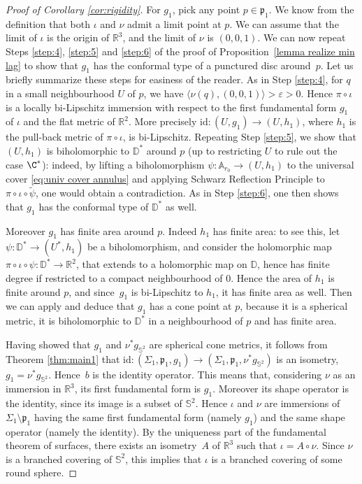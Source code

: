 \documentclass[JEP,XML,SOM,Unicode,NoEqCountersInSection,published]{cedram}
\let\epsilon\varepsilon
\newcounter{steps}
\theoremstyle{definition}
\newcommand{\R}{{\mathbb R}}
\begin{document}
\begin{proof}[Proof of Corollary \ref{cor:rigidity}]
For $g_1$, pick any point $p\in\mathfrak p_1$. We know from the definition that both $\iota$ and $\nu$ admit a limit point at $p$. We can assume that the limit of $\iota$ is the origin of $\R^3$, and the limit of $\nu$ is $(0,0,1)$. We can now repeat Steps \ref{step:4}, \ref{step:5} and \ref{step:6} of the proof of Proposition~\ref{lemma realize min lag} to show that $g_1$ has the conformal type of a punctured disc around~$p$.
Let us briefly summarize these steps for easiness of the reader.
As in Step \ref{step:4}, for $q$ in a small neighbourhood $U$ of $p$, we have $\langle\nu(q),(0,0,1)\rangle>\epsilon>0$. Hence $\pi\circ \iota$ is a locally bi-Lipschitz immersion with respect to the first fundamental form $g_1$ of $\iota$ and the flat metric of $\R^2$. More precisely $\mathrm{id}:(U,g_1)\to (U,h_1)$, where $h_1$ is the pull-back metric of $\pi\circ \iota$, is bi-Lipschitz. Repeating Step \ref{step:5}, we show that $(U,h_1)$ is biholomorphic to $\mathbb D^*$ around $p$ (up to restricting $U$ to rule out the case $\C^*$): indeed, by lifting a biholomorphism $\psi:{\mathbb A_{r_0}}\to(U,h_1)$ to the universal cover \eqref{eq:univ cover annulus} and applying Schwarz Reflection Principle to $\pi\circ\iota\circ\widetilde\psi$, one would obtain a contradiction. As in Step \ref{step:6}, one then shows that $g_1$ has the conformal type of $\mathbb D^*$ as well.

Moreover $g_1$ has finite area around $p$. Indeed $h_1$ has finite area: to see this, let $\psi:\mathbb D^*\to (U^*,h_1)$ be a biholomorphism, and consider the holomorphic map $\pi\circ \iota\circ\psi:\mathbb D^*\to\R^2$, that extends to a holomorphic map on $\mathbb D$, hence has finite degree if restricted to a compact neighbourhood of $0$. Hence the area of $h_1$ is finite around $p$, and since~$g_1$ is bi-Lipschitz to $h_1$, it has finite area as well. Then we can apply \cite[Prop.\,4]{zbMATH04034587} and deduce that $g_1$ has a cone point at $p$, because it is a spherical metric, it is biholomorphic to $\mathbb D^*$ in a neighbourhood of $p$ and has finite area.

Having showed that $g_1$ and $\nu^*g_{\mathbb S^2}$ are spherical cone metrics, it follows from Theorem \ref{thm:main1} that $\mathrm{id}:(\Sigma_1,\mathfrak p_1,g_1)\to (\Sigma_1,\mathfrak p_1,\nu^*g_{\mathbb S^2})$ is an isometry, \ie $g_1=\nu^*g_{\mathbb S^2}$. Hence~$b$ is the identity operator. This means that, considering $\nu$ as an immersion in $\R^3$, its first fundamental form is $g_1$. Moreover its shape operator is the identity, since its image is a subset of $\mathbb S^2$. Hence $\iota$ and $\nu$ are immersions of $\Sigma_1\setminus\mathfrak p_1$ having the same first fundamental form (namely $g_1$) and the same shape operator (namely the identity). By the uniqueness part of the fundamental theorem of surfaces, there exists an isometry~$A$ of $\R^3$ such that $\iota=A\circ\nu$. Since $\nu$ is a branched covering of $\mathbb S^2$, this implies that $\iota$ is a branched covering of some round sphere.
\end{proof}
\end{document}
